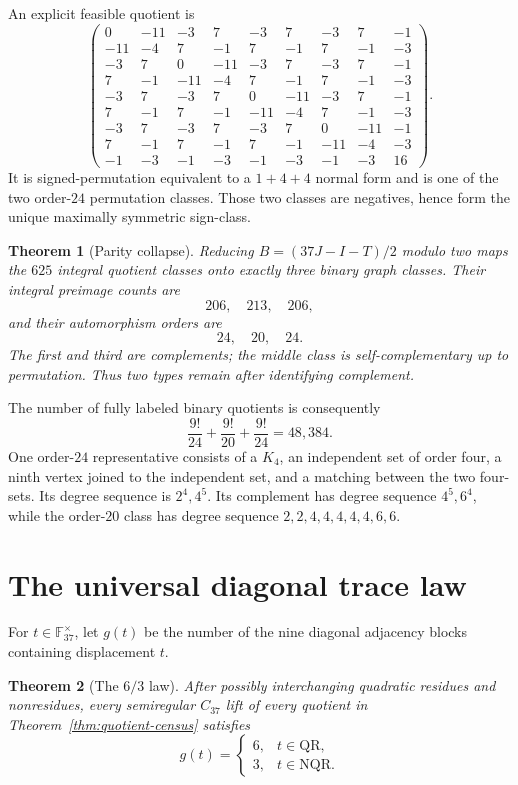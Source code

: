 \documentclass[11pt]{article}
\newtheorem{theorem}{Theorem}[section]
\theoremstyle{definition}
\newcommand{\F}{\mathbb{F}}
\newcommand{\QR}{\mathrm{QR}}
\newcommand{\NQR}{\mathrm{NQR}}
\begin{document}
An explicit feasible quotient is
\[
\left(
\begin{array}{rrrrrrrrr}
0&-11&-3&7&-3&7&-3&7&-1\\
-11&-4&7&-1&7&-1&7&-1&-3\\
-3&7&0&-11&-3&7&-3&7&-1\\
7&-1&-11&-4&7&-1&7&-1&-3\\
-3&7&-3&7&0&-11&-3&7&-1\\
7&-1&7&-1&-11&-4&7&-1&-3\\
-3&7&-3&7&-3&7&0&-11&-1\\
7&-1&7&-1&7&-1&-11&-4&-3\\
-1&-3&-1&-3&-1&-3&-1&-3&16
\end{array}
\right).
\tag{3.1}\label{eq:certified-T}
\]
It is signed-permutation equivalent to a \(1+4+4\) normal form and is one
of the two order-\(24\) permutation classes.  Those two classes are
negatives, hence form the unique maximally symmetric sign-class.

\begin{theorem}[Parity collapse]
\label{thm:parity-types}
Reducing \(B=(37J-I-T)/2\) modulo two maps the \(625\) integral quotient
classes onto exactly three binary graph classes.  Their integral preimage
counts are
\[
206,\quad213,\quad206,
\]
and their automorphism orders are
\[
24,\quad20,\quad24.
\]
The first and third are complements; the middle class is
self-complementary up to permutation.  Thus two types remain after
identifying complement.
\end{theorem}

The number of fully labeled binary quotients is consequently
\[
\frac{9!}{24}+\frac{9!}{20}+\frac{9!}{24}=48{,}384.
\]
One order-\(24\) representative consists of a \(K_4\), an independent
set of order four, a ninth vertex joined to the independent set, and a
matching between the two four-sets.  Its degree sequence is
\(2^4,4^5\).  Its complement has degree sequence \(4^5,6^4\), while the
order-\(20\) class has degree sequence \(2,2,4,4,4,4,4,6,6\).

\section{The universal diagonal trace law}
\label{sec:trace-law}

For \(t\in\F_{37}^{\times}\), let \(g(t)\) be the number of the nine
diagonal adjacency blocks containing displacement \(t\).

\begin{theorem}[The \(6/3\) law]
\label{thm:trace-law}
After possibly interchanging quadratic residues and nonresidues, every
semiregular \(C_{37}\) lift of every quotient in
Theorem~\ref{thm:quotient-census} satisfies
\[
 g(t)=
 \begin{cases}
 6,&t\in\QR,\\
 3,&t\in\NQR.
 \end{cases}
\tag{4.1}\label{eq:63-law}
\]
\end{theorem}
\end{document}
